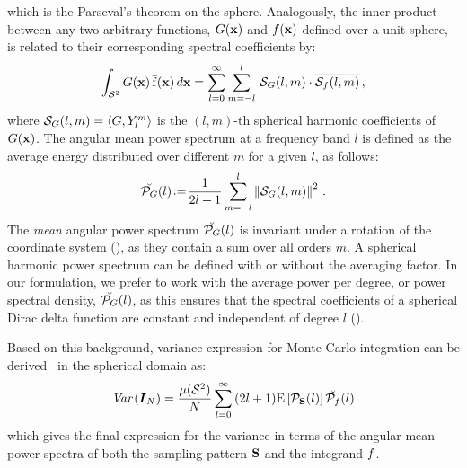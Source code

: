 which is the Parseval's theorem on the sphere. Analogously,
the inner product between any two arbitrary functions, ${G}(\mathbf{x})$ and
${f}(\mathbf{x})$ defined over a unit sphere, is related to their corresponding spectral coefficients by:
%
\begin{equation}
\int_{{\mathcal{S}^{2}}} {G}(\mathbf{x}) \, \mathrm{\overline{{f}}}(\mathbf{x}) \, d\mathbf{x} =
\sum_{l=0}^{\infty} \sum_{m=-l}^{l}\, \mathcal{S}_{{G}}(l,m)\cdot\overline{\mathcal{S}_{{f}}(l,m)}\,,
\end{equation}
%
where $\mathcal{S}_{{G}}(l,m)=\langle{G},Y_l^m\rangle$ is the $(l,m)$-th spherical harmonic coefficients of ${G}(\mathbf{x})$. The angular mean power spectrum at a frequency band $l$ is defined as the average energy distributed over different $m$ for a given $l$, as follows:
%
\begin{equation}
\breve{\mathcal{P}_{{G}}}(l) \!\mathrel{\mathop:}=\! \frac{1}{2l+1} \sum_{m=-l}^{l} \left\|\mathcal{S}_{{G}}(l,m)\right\|^2\,.
\end{equation}
%
The \emph{mean} angular power spectrum $\breve{\mathcal{P}_{{G}}}(l)$ is invariant 
under a rotation of the coordinate system (\cite{Kaula1967,lowes1974spatial}), as they contain a sum over all orders $m$. 
A spherical harmonic power spectrum can be defined with or without the averaging factor. In our formulation, 
we prefer to work with the average power per degree, or power spectral density, $\breve{\mathcal{P}_{{G}}}(l)$, as 
this ensures that the spectral coefficients of a spherical Dirac delta function are constant and independent of degree $l$  (\cite{hipkin2001statistics}). 

%
Based on this background, variance expression for Monte Carlo integration can be derived~\cite{Pilleboue:2015:VAM} in the spherical domain as:
%
\begin{align}
\label{eq:sphere_var_finale}
\textit{Var}\left({\boldsymbol{I}_N}\right) = \frac{{\mu({\mathcal{S}^{2}})}}{N} \sum_{l=0}^{\infty}\, (2l+1) \mathrm{E} \left[\mathcal{P}_{\textbf{S}}(l) \right] \breve{\mathcal{P}_{{f}}}(l)
\end{align}
%
which gives the final expression for the variance in terms of the angular mean power spectra of both the sampling pattern 
$\textbf{S}$ and the integrand ${f}$. 
